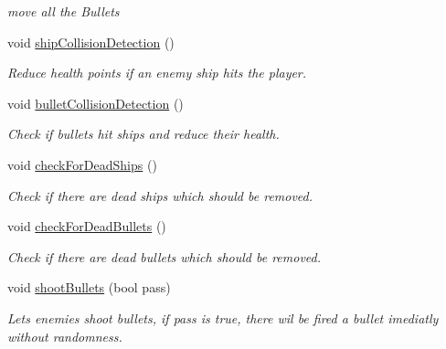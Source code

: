 \begin{DoxyCompactItemize}
\begin{DoxyCompactList}\small\item\em move all the Bullets \end{DoxyCompactList}\item 
\hypertarget{classty_lib_1_1_h_a_l9000_a8d4bb0ef4678714e4b4639026a26049d}{}void \hyperlink{classty_lib_1_1_h_a_l9000_a8d4bb0ef4678714e4b4639026a26049d}{ship\+Collision\+Detection} ()\label{classty_lib_1_1_h_a_l9000_a8d4bb0ef4678714e4b4639026a26049d}

\begin{DoxyCompactList}\small\item\em Reduce health points if an enemy ship hits the player. \end{DoxyCompactList}\item 
\hypertarget{classty_lib_1_1_h_a_l9000_a7eea5b4e9bffdd3645202a4f80531b26}{}void \hyperlink{classty_lib_1_1_h_a_l9000_a7eea5b4e9bffdd3645202a4f80531b26}{bullet\+Collision\+Detection} ()\label{classty_lib_1_1_h_a_l9000_a7eea5b4e9bffdd3645202a4f80531b26}

\begin{DoxyCompactList}\small\item\em Check if bullets hit ships and reduce their health. \end{DoxyCompactList}\item 
\hypertarget{classty_lib_1_1_h_a_l9000_aaeda21c9905ed0dddc951aac181e535f}{}void \hyperlink{classty_lib_1_1_h_a_l9000_aaeda21c9905ed0dddc951aac181e535f}{check\+For\+Dead\+Ships} ()\label{classty_lib_1_1_h_a_l9000_aaeda21c9905ed0dddc951aac181e535f}

\begin{DoxyCompactList}\small\item\em Check if there are dead ships which should be removed. \end{DoxyCompactList}\item 
\hypertarget{classty_lib_1_1_h_a_l9000_a929f2166e46267bcae117c70a7a3366c}{}void \hyperlink{classty_lib_1_1_h_a_l9000_a929f2166e46267bcae117c70a7a3366c}{check\+For\+Dead\+Bullets} ()\label{classty_lib_1_1_h_a_l9000_a929f2166e46267bcae117c70a7a3366c}

\begin{DoxyCompactList}\small\item\em Check if there are dead bullets which should be removed. \end{DoxyCompactList}\item 
\hypertarget{classty_lib_1_1_h_a_l9000_a51b757a3f19246bb9e7562a74c715876}{}void \hyperlink{classty_lib_1_1_h_a_l9000_a51b757a3f19246bb9e7562a74c715876}{shoot\+Bullets} (bool pass)\label{classty_lib_1_1_h_a_l9000_a51b757a3f19246bb9e7562a74c715876}

\begin{DoxyCompactList}\small\item\em Let\textquotesingle{}s enemies shoot bullets, if pass is true, there wil be fired a bullet imediatly without randomness. \end{DoxyCompactList}\end{DoxyCompactItemize}


